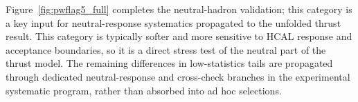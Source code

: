 \noindent
Figure~\ref{fig:pwflag5_full} completes the neutral-hadron validation; this category is a key
input for neutral-response systematics propagated to the unfolded thrust result. This category is
typically softer and more sensitive to HCAL response and acceptance boundaries, so it is a direct
stress test of the neutral part of the thrust model. The remaining differences in low-statistics
tails are propagated through dedicated neutral-response and cross-check branches in the
experimental systematic program, rather than absorbed into ad hoc selections.

\FloatBarrier
